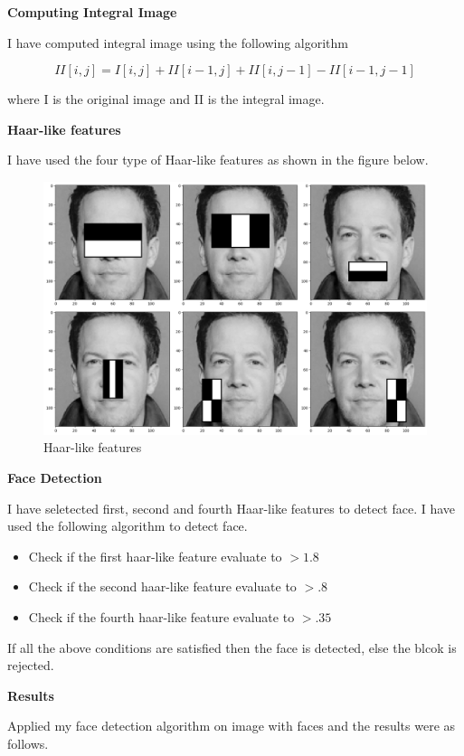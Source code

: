 \textbf{Computing Integral Image}

I have computed integral image using the following algorithm

\[
II[i, j] = I[i, j] + II[i-1, j] + II[i, j-1] - II[i-1, j-1]
\]

where I is the original image and II is the integral image.

\textbf{Haar-like features}

I have used the four type of Haar-like features as shown in the figure below.

\begin{figure}[H]
    \centering
    \includegraphics[width=.7\textwidth]{imgs/haar_like_features.png}
    \caption{Haar-like features}
    \label{fig:2_mediapipe}
\end{figure}

\textbf{Face Detection}

I have seletected first, second and fourth Haar-like features to detect face. I have used the following algorithm to detect face.

\begin{itemize}
    \item Check if the first haar-like feature evaluate to $>1.8$
    \item Check if the second haar-like feature evaluate to $>.8$
    \item Check if the fourth haar-like feature evaluate to $>.35$
\end{itemize}

If all the above conditions are satisfied then the face is detected, else the blcok is rejected.

\textbf{Results}

Applied my face detection algorithm on image with faces and the results were as follows.

